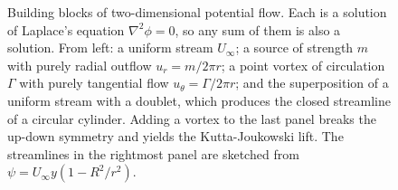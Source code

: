 \begin{figure}[htbp]
\begin{tikzpicture}
\end{tikzpicture}
\caption[Elementary potential flows and their superposition]{Building
blocks of two-dimensional potential flow. Each is a solution of
Laplace's equation $\nabla^2\phi=0$, so any sum of them is also a
solution. From left: a uniform stream $U_\infty$; a source of
strength $m$ with purely radial outflow $u_r = m/2\pi r$; a point
vortex of circulation $\Gamma$ with purely tangential flow
$u_\theta = \Gamma/2\pi r$; and the superposition of a uniform stream
with a doublet, which produces the closed streamline of a circular
cylinder. Adding a vortex to the last panel breaks the up-down
symmetry and yields the Kutta-Joukowski lift. The streamlines in the
rightmost panel are sketched from $\psi = U_\infty y(1-R^2/r^2)$.}
\label{fig:vol03ch11:potential-superposition}
\end{figure}
